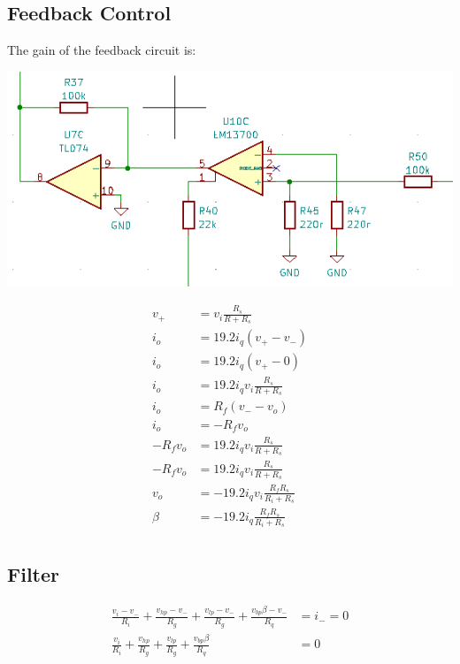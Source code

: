 \documentclass{article}
\begin{document}
\subsection{Feedback Control}

The gain of the feedback circuit is:

\includegraphics[width=\linewidth]{images/inverting-feedback-amp.png}

\begin{equation*}
\begin{split}
  v_+ & = v_i\frac{R_s}{R + R_s} \\
  i_o & = 19.2i_{q}(v_+ - v_-) \\
  i_o & = 19.2i_{q}(v_+ - 0) \\
  i_o & = 19.2i_{q}v_i\frac{R_s}{R + R_s} \\
  i_o & = R_f(v_- - v_o) \\
  i_o & = -R_fv_o \\
  -R_fv_o & = 19.2i_{q}v_i\frac{R_s}{R + R_s} \\
  -R_fv_o & = 19.2i_{q}v_i\frac{R_s}{R + R_s} \\
  v_o & = -19.2i_{q}v_i\frac{R_fR_s}{R_i + R_s} \\
  \beta & = -19.2i_{q}\frac{R_fR_s}{R_i + R_s} \\
\end{split}
\end{equation*}

\subsection{Filter}

\begin{equation*}
\begin{split}
  \frac{v_i - v_-}{R_i} + \frac{v_{hp} - v_-}{R_g} + \frac{v_{lp} - v_-}{R_g}  + \frac{v_{bp}\beta - v_-}{R_q} & = i_- = 0 \\
  \frac{v_i}{R_i} + \frac{v_{hp}}{R_g} + \frac{v_{lp}}{R_g}  + \frac{v_{bp}\beta}{R_q} & = 0 \\
\end{split}
\end{equation*}
\end{document}
